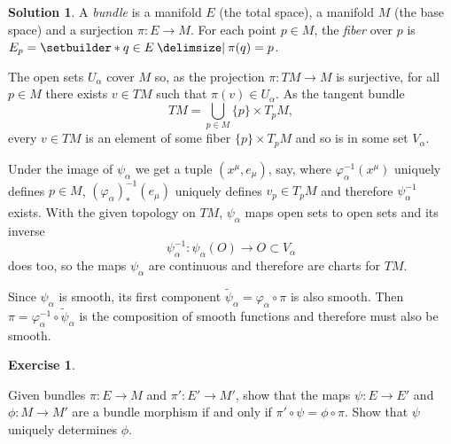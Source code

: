 \documentclass[11pt, a4paper]{report}
\theoremstyle{definition}
\newtheorem{exercise}{Exercise}[part]
\newtheorem{solution}{Solution}[part]
\newenvironment{ex}{\begin{exercise}}{\end{exercise}\pagebreak[1]}
\newenvironment{sol}{\begin{solution}}{\end{solution}\pagebreak[3]}
\begin{document}
\begin{sol}

A \emph{bundle} is a manifold $E$ (the total space), a manifold $M$ (the base space) and a surjection $\pi: E \to M$. For each point $p \in M$, the \emph{fiber} over $p$ is $E_p = \setbuilder*{q \in E \given \pi(q) = p}$.

The open sets $U_\alpha$ cover $M$ so, as the projection $\pi: TM \to M$ is surjective, for all $p \in M$ there exists $v \in TM$ such that $\pi(v) \in U_\alpha$.
As the tangent bundle
\[
    TM = \bigcup_{p \in M} \{p\} \times T_p M,
\]
every $v \in TM$ is an element of some fiber $\{p\} \times T_p M$ and so is in some set $V_\alpha$.

Under the image of $\psi_\alpha$ we get a tuple $(x^\mu, e_\mu)$, say, where
$\varphi_\alpha^{-1}(x^\mu)$ uniquely defines $p \in M$,
${(\varphi_\alpha)}_*^{-1}(e_\mu)$ uniquely defines $v_p \in T_p M$
and therefore $\psi_\alpha^{-1}$ exists.
With the given topology on $TM$, $\psi_\alpha$ maps open sets to open sets and its inverse
\[
    \psi_\alpha^{-1}: \psi_\alpha(O) \to O \subset V_\alpha
\]
does too, so the maps $\psi_\alpha$ are continuous and therefore are charts for $TM$.

Since $\psi_\alpha$ is smooth, its first component $\tilde{\psi}_\alpha = \varphi_\alpha \circ \pi$ is also smooth.
Then $\pi = \varphi_\alpha^{-1} \circ \tilde{\psi}_\alpha$ is the composition of smooth functions and therefore must also be smooth.

\end{sol}

\begin{ex}\label{ex:bundlemorphism}

Given bundles $\pi: E \to M$ and $\pi': E' \to M'$, show that the maps $\psi: E \to E'$ and $\phi: M \to M'$ are a bundle morphism if and only if $\pi' \circ \psi = \phi \circ \pi$.
Show that $\psi$ uniquely determines $\phi$.

\end{ex}
\end{document}

